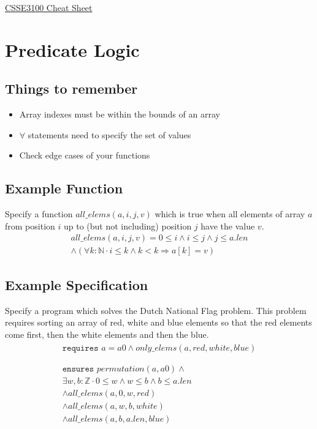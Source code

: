 \documentclass[landscape]{cheat}
\begin{document}
\footnotesize
\begin{multicols*}{3}

\begin{center}
\Large{\underline{CSSE3100 Cheat Sheet}} \\
\end{center}

\section{Predicate Logic}

\subsection{Things to remember}
\begin{itemize}
    \item Array indexes must be within the bounds of an array
    \item $\forall$ statements need to specify the set of values
    \item Check edge cases of your functions
\end{itemize}

\subsection{Example Function}
Specify a function $all\_elems(a, i, j, v)$ which is true when all elements of array $a$ from position $i$ up to (but not including) position $j$ have the value $v$.
\begin{multline*}
all\_elems(a, i, j, v) =
    0 \leq i
    \land i \leq j
    \land j \leq a.len \\
    \land (\forall k : \mathbb{N} \cdot
        i \leq k
        \land k < k
        \Rightarrow a[k] = v
    )
\end{multline*}

\subsection{Example Specification}
Specify a program which solves the Dutch National Flag problem.
This problem requires sorting an array of red, white and blue elements so that the red elements come first, then the white elements and then the blue.
\begin{gather}
\nonumber
\begin{split}
\texttt{requires } a = a0 \land only\_elems(a, red, white, blue) \\
\end{split}
\\
\nonumber
\begin{split}
\texttt{ensures } permutation(a, a0) \land \\
    \exists w, b : \mathbb{Z} \cdot 0 \leq w \land w \leq b \land b \leq a.len \\
    \land all\_elems(a, 0, w, red) \\
    \land all\_elems(a, w, b, white) \\
    \land all\_elems(a, b, a.len, blue)
\end{split}
\end{gather}


\end{multicols*}
\end{document}
